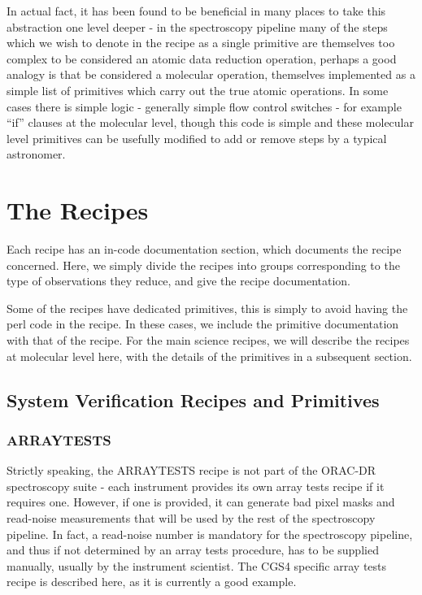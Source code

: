 \documentclass[twoside,11pt]{article}
\renewcommand{\_}{\texttt{\symbol{95}}}
\begin{document}
In actual fact, it has been found to be beneficial in many places to
take this abstraction one level deeper - in the spectroscopy pipeline
many of the steps which we wish to denote in the recipe as a single
primitive are themselves too complex to be considered an atomic data
reduction operation, perhaps a good analogy is that be considered a
molecular operation, themselves implemented as a simple list of
primitives which carry out the true atomic operations. In some cases
there is simple logic - generally simple flow control switches - for
example ``if'' clauses at the molecular level, though this code is
simple and these molecular level primitives can be usefully modified
to add or remove steps by a typical astronomer.

\section{The Recipes}

Each recipe has an in-code documentation section, which documents the
recipe concerned. Here, we simply divide the recipes into groups
corresponding to the type of observations they reduce, and give the
recipe documentation.

Some of the recipes have dedicated primitives, this is simply to
avoid having the perl code in the recipe. In these cases, we include
the primitive documentation with that of the recipe. For the main
science recipes, we will describe the recipes at molecular level
here, with the details of the primitives in a subsequent section.

\subsection{System Verification Recipes and Primitives}

\subsubsection{ARRAY\_TESTS}

Strictly speaking, the ARRAY\_TESTS recipe is not part of the ORAC-DR
spectroscopy suite - each instrument provides its own array tests
recipe if it requires one. However, if one is provided, it can
generate bad pixel masks and read-noise measurements that will be used
by the rest of the spectroscopy pipeline. In fact, a read-noise number
is mandatory for the spectroscopy pipeline, and thus if not determined
by an array tests procedure, has to be supplied manually, usually by
the instrument scientist. The CGS4 specific array tests recipe is
described here, as it is currently a good example.
\end{document}
